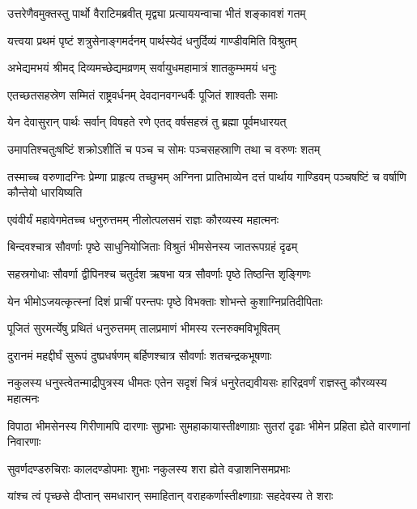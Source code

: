 \twolineshloka
{उत्तरेणैवमुक्तस्तु पार्थो वैराटिमब्रवीत्}
{मृद्व्या प्रत्याययन्वाचा भीतं शङ्कावशं गतम्}




\twolineshloka
{यत्त्वया प्रथमं पृष्टं शत्रुसेनाङ्गमर्दनम्}
{पार्थस्येदं धनुर्दिव्यं गाण्डीवमिति विश्रुतम्}


\twolineshloka
{अभेद्यमभयं श्रीमद् दिव्यमच्छेद्यमव्रणम्}
{सर्वायुधमहामात्रं शातकुम्भमयं धनुः}


\twolineshloka
{एतच्छतसहस्रेण सम्मितं राष्ट्रवर्धनम्}
{देवदानवगन्धर्वैः पूजितं शाश्वतीः समाः}


\twolineshloka
{येन देवासुरान् पार्थः सर्वान् विषहते रणे}
{एतद् वर्षसहस्रं तु ब्रह्मा पूर्वमधारयत्}


\twolineshloka
{उमापतिश्चतुःषष्टिं शक्रोऽशीतिं च पञ्च च}
{सोमः पञ्चसहस्राणि तथा च वरुणः शतम्}


\threelineshloka
{तस्माच्च वरुणादग्निः प्रेम्णा प्राहृत्य तच्छुभम्}
{अग्निना प्रातिभाव्येन दत्तं पार्थाय गाण्डिवम्}
{पञ्चषष्टिं च वर्षाणि कौन्तेयो धारयिष्यति}


\twolineshloka
{एवंवीर्यं महावेगमेतच्च धनुरुत्तमम्}
{नीलोत्पलसमं राज्ञः कौरव्यस्य महात्मनः}


\twolineshloka
{बिन्दवश्चात्र सौवर्णाः पृष्ठे साधुनियोजिताः}
{विश्रुतं भीमसेनस्य जातरूपग्रहं दृढम्}


\twolineshloka
{सहस्रगोधाः सौवर्णा द्वीपिनश्च चतुर्दश}
{ऋषभा यत्र सौवर्णाः पृष्ठे तिष्ठन्ति शृङ्गिणः}


\twolineshloka
{येन भीमोऽजयत्कृत्स्नां दिशं प्राचीं परन्तपः}
{पृष्ठे विभक्ताः शोभन्ते कुशाग्निप्रतिदीपिताः}


\twolineshloka
{पूजितं सुरमर्त्येषु प्रथितं धनुरुत्तमम्}
{तालप्रमाणं भीमस्य रत्नरुक्मविभूषितम्}


\twolineshloka
{दुरानमं महद्दीर्घं सुरूपं दुष्प्रधर्षणम्}
{बर्हिणश्चात्र सौवर्णाः शतचन्द्रकभूषणाः}


\threelineshloka
{नकुलस्य धनुस्त्वेतन्माद्रीपुत्रस्य धीमतः}
{एतेन सदृशं चित्रं धनुरेतद्यवीयसः}
{हारिद्रवर्णं राज्ञस्तु कौरव्यस्य महात्मनः}


\threelineshloka
{विपाठा भीमसेनस्य गिरीणामपि दारणाः}
{सुप्रभाः सुमहाकायास्तीक्ष्णाग्राः सुतरां दृढाः}
{भीमेन प्रहिता ह्येते वारणानां निवारणाः}


\twolineshloka
{सुवर्णदण्डरुचिराः कालदण्डोपमाः शुभाः}
{नकुलस्य शरा ह्येते वज्राशनिसमप्रभाः}


\twolineshloka
{यांश्च त्वं पृच्छसे दीप्तान् समधारान् समाहितान्}
{वराहकर्णास्तीक्ष्णाग्राः सहदेवस्य ते शराः}


